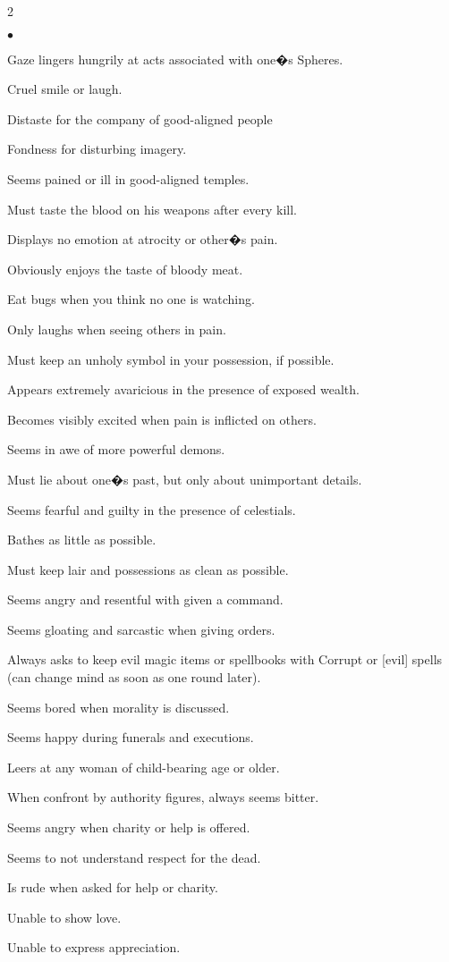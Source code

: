 \begin{table}[tbh]
\begin{small}
\begin{multicols}{2}
\begin{list}{$\bullet$}{\itemspace}
\item Gaze lingers hungrily at acts associated with one�s Spheres.
\item Cruel smile or laugh.
\item Distaste for the company of good-aligned people
\item Fondness for disturbing imagery.
\item Seems pained or ill in good-aligned temples.
\item Must taste the blood on his weapons after every kill.
\item Displays no emotion at atrocity or other�s pain.
\item Obviously enjoys the taste of bloody meat.
\item Eat bugs when you think no one is watching.
\item Only laughs when seeing others in pain.
\item Must keep an unholy symbol in your possession, if possible.
\item Appears extremely avaricious in the presence of exposed wealth.
\item Becomes visibly excited when pain is inflicted on others.
\item Seems in awe of more powerful demons.
\item Must lie about one�s past, but only about unimportant details.
\item Seems fearful and guilty in the presence of celestials.
\item Bathes as little as possible.
\item Must keep lair and possessions as clean as possible.
\item Seems angry and resentful with given a command.
\item Seems gloating and sarcastic when giving orders.
\item Always asks to keep evil magic items or spellbooks with Corrupt or [evil] spells (can change mind as soon as one round later).
\item Seems bored when morality is discussed.
\item Seems happy during funerals and executions.
\item Leers at any woman of child-bearing age or older.
\item When confront by authority figures, always seems bitter.
\item Seems angry when charity or help is offered.
\item Seems to not understand respect for the dead.
\item Is rude when asked for help or charity.
\item Unable to show love.
\item Unable to express appreciation.
\end{list}
\end{multicols}
\end{small}
\end{table}
